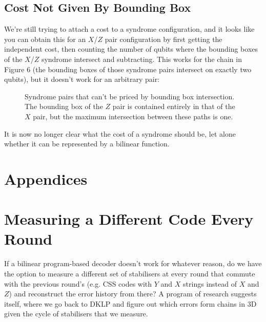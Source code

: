 \documentclass[a4paper, english]{scrartcl}
\begin{document}
\subsection{Cost Not Given By Bounding Box}
We're still trying to attach a cost to a syndrome configuration, and it looks like you can obtain this for an $X$/$Z$ pair configuration by first getting the independent cost, then counting the number of qubits where the bounding boxes of the $X$/$Z$ syndrome intersect and subtracting.
This works for the chain in Figure 6 (the bounding boxes of those syndrome pairs intersect on exactly two qubits), but it doesn't work for an arbitrary pair:
\begin{figure}[!h]
\centering
{}
\caption{Syndrome pairs that can't be priced by bounding box intersection. 
The bounding box of the $Z$ pair is contained entirely in that of the $X$ pair, but the maximum intersection between these paths is one.}
\end{figure}
\FloatBarrier
It is now no longer clear what the cost of a syndrome should be, let alone whether it can be represented by a bilinear function.


\section*{Appendices}
\appendix
\section{Measuring a Different Code Every Round}
If a bilinear program-based decoder doesn't work for whatever reason, do we have the option to measure a different set of stabilisers at every round that commute with the previous round's (e.g. CSS codes with $Y$ and $X$ strings instead of $X$ and $Z$) and reconstruct the error history from there?
A program of research suggests itself, where we go back to DKLP and figure out which errors form chains in 3D given the cycle of stabilisers that we measure. 
\end{document}
